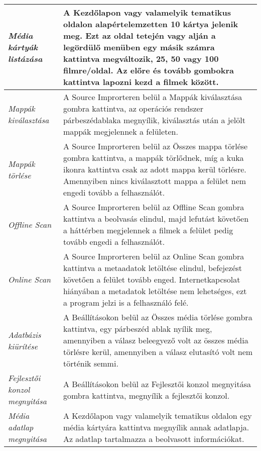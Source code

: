 \begin{center}
\begin{longtable}{ | p{} | p{} | }
        \emph{Média kártyák listázása}
		& A Kezdőlapon vagy valamelyik tematikus oldalon alapértelemzetten 10 kártya jelenik meg. Ezt az oldal tetején vagy alján a legördülő menüben egy másik számra kattintva megváltozik, 25, 50 vagy 100 filmre/oldal. Az előre és tovább gombokra kattintva lapozni kezd a filmek között.
		\\ \hline

		\emph{Mappák kiválasztása}
		& A Source Improrteren belül a Mappák kiválasztása gombra kattintva, az operációs rendszer párbeszédablaka megnyílik, kiválasztás után a jelölt mappák megjelennek a felületen.
		\\ \hline

        \emph{Mappák törlése}
		& A Source Improrteren belül az Összes mappa törlése gombra kattintva, a mappák törlődnek, míg a kuka ikonra kattintva csak az adott mappa kerül törlésre. Amennyiben nincs kiválasztott mappa a felület nem engedi tovább a felhasználót.
		\\ \hline

        \emph{Offline Scan}
		& A Source Improrteren belül az Offline Scan gombra kattintva a beolvasás elindul, majd lefutást követően a háttérben megjelennek a filmek a felület pedig tovább engedi a felhasználót.
		\\ \hline

        \emph{Online Scan}
		& A Source Improrteren belül az Online Scan gombra kattintva a metaadatok letöltése elindul, befejezést követően a felület tovább enged. Internetkapcsolat hiányában a metadatok letöltése nem lehetséges, ezt a program jelzi is a felhasználó felé.
		\\ \hline

        \emph{Adatbázis kiürítése}
		& A Beállításokon belül az Összes média törlése gombra kattintva, egy párbeszéd ablak nyílik meg, amennyiben a válasz beleegyező volt az összes média törlésre kerül, amennyiben a válasz elutasító volt nem történik semmi.
		\\ \hline

        \emph{Fejlesztői konzol megnyitása}
		& A Beállításokon belül az Fejlesztői konzol megnyitása gombra kattintva, megnyílik a fejlesztői konzol.
		\\ \hline

        \emph{Média adatlap megnyitása}
		& A Kezdőlapon vagy valamelyik tematikus oldalon egy média kártyára kattintva megnyílik annak adatlapja. Az adatlap tartalmazza a beolvasott információkat.
		\\ \hline


\end{longtable}
\end{center}
